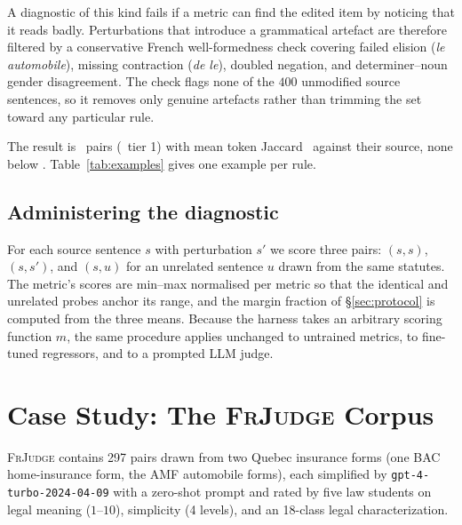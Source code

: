 \documentclass[11pt]{article}
\begin{document}
A diagnostic of this kind fails if a metric can find the edited item by noticing
that it reads badly. Perturbations that introduce a grammatical artefact are
therefore filtered by a conservative French well-formedness check covering
failed elision (\emph{le automobile}), missing contraction (\emph{de le}),
doubled negation, and determiner--noun gender disagreement. The check flags none
of the $400$ unmodified source sentences, so it removes only genuine artefacts
rather than trimming the set toward any particular rule.

The result is \numedits\ pairs (\numeditsTierOne\ tier 1) with mean token
Jaccard \meanjaccard\ against their source, none below \minjaccard.
Table~\ref{tab:examples} gives one example per rule.

\begin{table}[t]\centering\small

\caption{\textsc{LegalEdit} samples, one per perturbation rule, with the edited
span in bold. Each remains fluent and statutory in register, shares almost all
of its tokens with the original, and states a different rule of law.}
\label{tab:examples}
\end{table}

\subsection{Administering the diagnostic}

For each source sentence $s$ with perturbation $s'$ we score three pairs:
$(s,s)$, $(s,s')$, and $(s,u)$ for an unrelated sentence $u$ drawn from the same
statutes. The metric's scores are min--max normalised per metric so that the
identical and unrelated probes anchor its range, and the margin fraction of
\S\ref{sec:protocol} is computed from the three means. Because the harness takes
an arbitrary scoring function $m$, the same procedure applies unchanged to
untrained metrics, to fine-tuned regressors, and to a prompted LLM judge.

\section{Case Study: The \textsc{FrJudge} Corpus}
\label{sec:corpus}

\textsc{FrJudge} contains 297 pairs drawn from two Quebec insurance forms (one
BAC home-insurance form, the AMF automobile forms), each simplified by
\texttt{gpt-4-turbo-2024-04-09} with a zero-shot prompt and rated by five law
students on legal meaning ($1$--$10$), simplicity (4 levels), and an 18-class
legal characterization.
\end{document}
